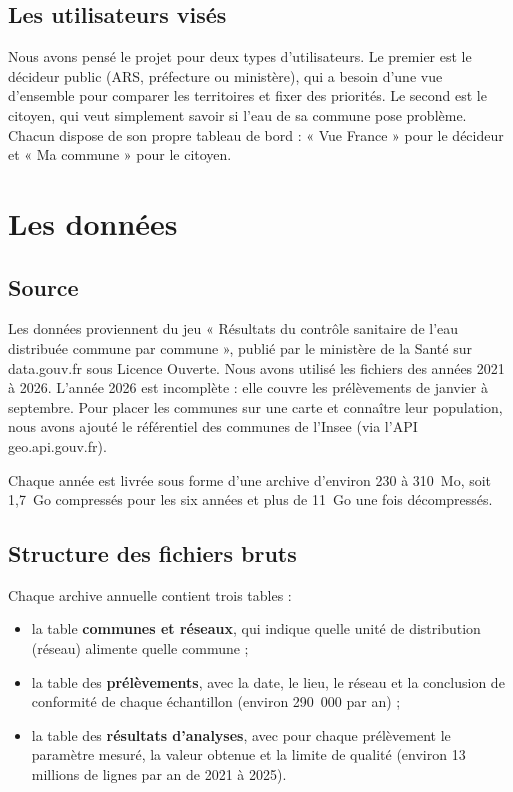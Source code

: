 \documentclass[11pt,a4paper]{article}
\begin{document}
\subsection{Les utilisateurs visés}

Nous avons pensé le projet pour deux types d'utilisateurs. Le premier est le décideur public (ARS, préfecture ou ministère), qui a besoin d'une vue d'ensemble pour comparer les territoires et fixer des priorités. Le second est le citoyen, qui veut simplement savoir si l'eau de sa commune pose problème. Chacun dispose de son propre tableau de bord : « Vue France » pour le décideur et « Ma commune » pour le citoyen.

\section{Les données}

\subsection{Source}

Les données proviennent du jeu « Résultats du contrôle sanitaire de l'eau distribuée commune par commune », publié par le ministère de la Santé sur data.gouv.fr sous Licence Ouverte. Nous avons utilisé les fichiers des années 2021 à 2026. L'année 2026 est incomplète : elle couvre les prélèvements de janvier à septembre. Pour placer les communes sur une carte et connaître leur population, nous avons ajouté le référentiel des communes de l'Insee (via l'API geo.api.gouv.fr).

Chaque année est livrée sous forme d'une archive d'environ 230 à 310~Mo, soit 1,7~Go compressés pour les six années et plus de 11~Go une fois décompressés.

\subsection{Structure des fichiers bruts}

Chaque archive annuelle contient trois tables :

\begin{itemize}
  \item la table \textbf{communes et réseaux}, qui indique quelle unité de distribution (réseau) alimente quelle commune ;
  \item la table des \textbf{prélèvements}, avec la date, le lieu, le réseau et la conclusion de conformité de chaque échantillon (environ 290~000 par an) ;
  \item la table des \textbf{résultats d'analyses}, avec pour chaque prélèvement le paramètre mesuré, la valeur obtenue et la limite de qualité (environ 13 millions de lignes par an de 2021 à 2025).
\end{itemize}
\end{document}
